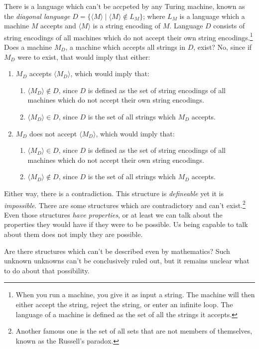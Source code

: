 \documentclass[oneside,hidelinks]{article}
\begin{document}
There is a language which can't be accpeted by any Turing machine, known as the \textit{diagonal language} $D = \{\langle M \rangle \mid \langle M \rangle \notin L_M \}$; where $L_M$ is a language which a machine $M$ accepts and $\langle M \rangle$ is a string encoding of $M$.
Language $D$ consists of string encodings of all machines which do not accept their own string encodings.\footnote
{
When you run a machine, you give it as input a string.
The machine will then either accept the string, reject the string, or enter an infinite loop.
The language of a machine is defined as the set of all the strings it accepts.
}
Does a machine $M_D$, a machine which accepts all strings in $D$, exist?
No, since if $M_D$ were to exist, that would imply that either:
\begin{enumerate}
\item $M_D$ accepts $\langle M_D \rangle$, which would imply that:
\begin{enumerate}
\item $\langle M_D \rangle \notin D$, since $D$ is defined as the set of string encodings of all machines which do not accept their own string encodings.
\item $\langle M_D \rangle \in D$, since $D$ is the set of all strings which $M_D$ accepts.
\end{enumerate}
\item $M_D$ does not accept $\langle M_D \rangle$, which would imply that:
\begin{enumerate}
\item $\langle M_D \rangle \in D$, since $D$ is defined as the set of string encodings of all machines which do not accept their own string encodings.
\item $\langle M_D \rangle \notin D$, since $D$ is the set of all strings which $M_D$ accepts.
\end{enumerate}
\end{enumerate}
Either way, there is a contradiction. This structure is \textit{defineable} yet it is \textit{impossible}.
There are some structures which are contradictory and can't exist.\footnote{Another famous one is the set of all sets that are not members of themselves, known as the Russell's paradox.}
Even those structures \textit{have properties}, or at least we can talk about the properties they would have if they were to be possible.
Us being capable to talk about them does not imply they are possible.

Are there structures which can't be described even by mathematics?
Such unknown unknowns can't be conclusively ruled out, but it remains unclear what to do about that possibility.
\end{document}
